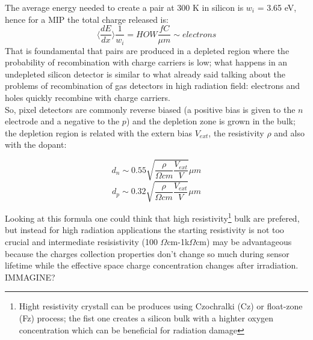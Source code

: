 \begin{titlepage}
The average energy needed to create a pair at 300 K in silicon is $w_i$ = 3.65 eV, hence for a MIP the total charge 
released is: 
\begin{equation}
   \langle \frac{dE}{dx}\rangle \frac{1}{w_i} = HOW \frac{fC}{\mu m} \sim electrons
\end{equation}
That is foundamental that pairs are produced in a depleted region where the probability
of recombination with charge carriers is low; what happens in an undepleted silicon detector
is similar to what already said talking about the problems of recombination of gas detectors 
in high radiation field: electrons and holes quickly recombine with charge carriers.\\
So, pixel detectors are commonly reverse biased (a positive bias is given 
to the $n$ electrode and a negative to the $p$) and the depletion zone is grown in the bulk; 
the depletion region is related with the extern bias $V_{ext}$, the resistivity $\rho$ and also
with the dopant:
\begin{multicols}{2}
\begin{equation}
   d_{n} \sim 0.55 \sqrt{\frac{\rho}{\Omega cm}\frac{V_{ext}}{V}} \mu m 
\end{equation}\break
\begin{equation}
   d_{p} \sim 0.32 \sqrt{\frac{\rho}{\Omega cm}\frac{V_{ext}}{V}} \mu m
\end{equation}
\label{eq:deplation_d}
\end{multicols}
Looking at this formula one could think that high resistivity\footnote{Hight resistivity
crystall can be produces using Czochralki (Cz) or float-zone (Fz) process;
the fist one creates a silicon bulk with a highter oxygen concentration
which can be beneficial for radiation damage} bulk are prefered, but
instead for high radiation applications the starting resistivity is not too crucial
and intermediate resisistivity (100 $\Omega$cm-1k$\Omega$cm) may be advantageous 
because the charges collection properties don't  change so much during sensor lifetime 
while the effective space charge concentration changes after irradiation. IMMAGINE?\\


\end{titlepage}
